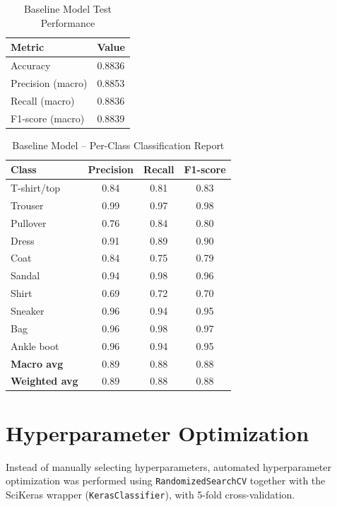 \documentclass[11pt]{article}
\begin{document}
\begin{table}[H]
\centering
\caption{Baseline Model Test Performance}
\begin{tabular}{@{}ll@{}}
\toprule
\textbf{Metric} & \textbf{Value} \\
\midrule
Accuracy  & 0.8836 \\
Precision (macro) & 0.8853 \\
Recall (macro)    & 0.8836 \\
F1-score (macro)  & 0.8839 \\
\bottomrule
\end{tabular}
\end{table}

\begin{table}[H]
\centering
\caption{Baseline Model -- Per-Class Classification Report}
\begin{tabular}{@{}lccc@{}}
\toprule
\textbf{Class} & \textbf{Precision} & \textbf{Recall} & \textbf{F1-score} \\
\midrule
T-shirt/top & 0.84 & 0.81 & 0.83 \\
Trouser     & 0.99 & 0.97 & 0.98 \\
Pullover    & 0.76 & 0.84 & 0.80 \\
Dress       & 0.91 & 0.89 & 0.90 \\
Coat        & 0.84 & 0.75 & 0.79 \\
Sandal      & 0.94 & 0.98 & 0.96 \\
Shirt       & 0.69 & 0.72 & 0.70 \\
Sneaker     & 0.96 & 0.94 & 0.95 \\
Bag         & 0.96 & 0.98 & 0.97 \\
Ankle boot  & 0.96 & 0.94 & 0.95 \\
\midrule
\textbf{Macro avg}    & 0.89 & 0.88 & 0.88 \\
\textbf{Weighted avg} & 0.89 & 0.88 & 0.88 \\
\bottomrule
\end{tabular}
\end{table}

\section{Hyperparameter Optimization}
Instead of manually selecting hyperparameters, automated hyperparameter
optimization was performed using \texttt{RandomizedSearchCV} together with the
SciKeras wrapper (\texttt{KerasClassifier}), with 5-fold cross-validation.
\end{document}
